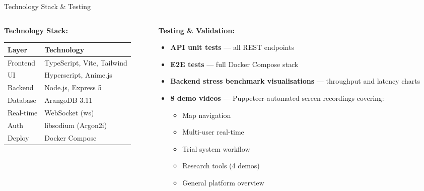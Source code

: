 \documentclass[aspectratio=169,11pt]{beamer}
\begin{document}
\begin{frame}{Technology Stack \& Testing}
  \begin{columns}[T]
    \begin{column}{0.48\textwidth}
      \textbf{Technology Stack:}
      \begin{center}
      \begin{tabular}{ll}
        \toprule
        \textbf{Layer} & \textbf{Technology} \\
        \midrule
        Frontend  & TypeScript, Vite, Tailwind \\
        UI        & Hyperscript, Anime.js \\
        Backend   & Node.js, Express 5 \\
        Database  & ArangoDB 3.11 \\
        Real-time & WebSocket (ws) \\
        Auth      & libsodium (Argon2i) \\
        Deploy    & Docker Compose \\
        \bottomrule
      \end{tabular}
      \end{center}
    \end{column}
    \begin{column}{0.48\textwidth}
      \textbf{Testing \& Validation:}
      \begin{itemize}
        \item \textbf{API unit tests} --- all REST endpoints
        \item \textbf{E2E tests} --- full Docker Compose stack
        \item \textbf{Backend stress benchmark visualisations} --- throughput and latency charts
        \item \textbf{8 demo videos} --- Puppeteer-automated screen recordings covering:
          \begin{itemize}
            \item Map navigation
            \item Multi-user real-time
            \item Trial system workflow
            \item Research tools (4 demos)
            \item General platform overview
          \end{itemize}
      \end{itemize}
    \end{column}
  \end{columns}
\end{frame}
\end{document}
